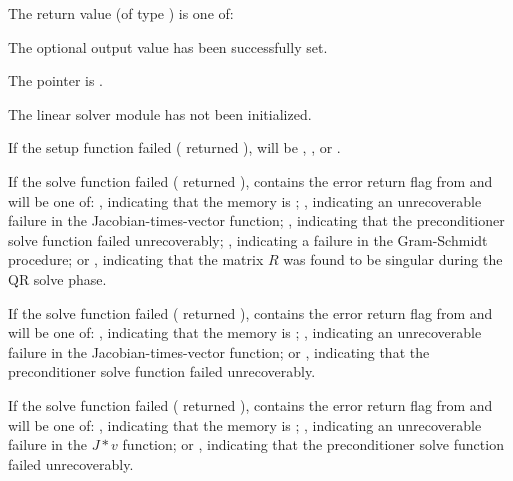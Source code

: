 {
  The return value  (of type ) is one of:
  \begin{args}
  \item[\Id{KINSPILS\_SUCCESS}] 
    The optional output value has been successfully set.
  \item[\Id{KINSPILS\_MEM\_NULL}]
    The  pointer is .
  \item[\Id{KINSPILS\_LMEM\_NULL}]
    The linear solver module has not been initialized.
  \end{args}
}
{
  If the {\kinspils} setup function failed ( returned
  ),  will be
  , , or
  .

  If the {\kinspgmr} solve function failed ( returned
  ),  contains the error return flag from
   and will be one of:
  , indicating that the {\spgmr} memory is ;
  , indicating an unrecoverable failure in the 
  Jacobian-times-vector function;
  , indicating that the preconditioner solve
  function  failed unrecoverably;
  , indicating a failure in the Gram-Schmidt procedure; 
  or , indicating that the matrix $R$ was found to be
  singular during the QR solve phase.

  If the {\kinspbcg} solve function failed ( returned
  ),  contains the error return flag from
   and will be one of:
  , indicating that the {\spbcg} memory is ;
  , indicating an unrecoverable failure in the 
  Jacobian-times-vector function; or
  , indicating that the preconditioner solve
  function  failed unrecoverably.

  If the {\kinsptfqmr} solve function failed ( returned
  ),  contains the error return flag from
   and will be one of:
  , indicating that the {\sptfqmr} memory is ;
  , indicating an unrecoverable failure in the 
  $J*v$ function; or 
  , indicating that the preconditioner solve
  function  failed unrecoverably.
}


